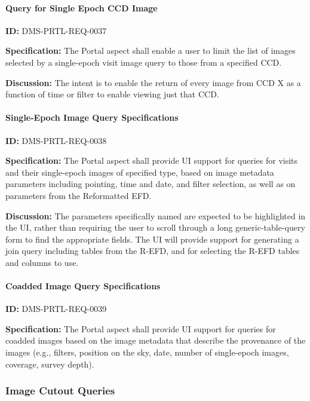 \documentclass[SE,toc]{lsstdoc}
\begin{document}
\paragraph{Query for Single Epoch CCD Image}\hfill  %

\label{DMS-PRTL-REQ-0037}
\textbf{ID:} DMS-PRTL-REQ-0037

\textbf{Specification:}
The Portal aspect shall enable a user to limit the list of images selected by a single-epoch visit image query to those from a specified CCD.

\textbf{Discussion:}
The intent is to enable the return of every image from CCD X as a function of time or filter to enable viewing just that CCD.

\paragraph{Single-Epoch Image Query Specifications}\hfill  %

\label{DMS-PRTL-REQ-0038}
\textbf{ID:} DMS-PRTL-REQ-0038

\textbf{Specification:}
The Portal aspect shall provide UI support for queries for visits and their single-epoch images of specified type, based on image metadata parameters including pointing, time and date, and filter selection, as well as on parameters from the Reformatted EFD.

\textbf{Discussion:}
The parameters specifically named are expected to be highlighted in the UI, rather than requiring the user to scroll through a long generic-table-query form to find the appropriate fields.  The UI will provide support for generating a join query including tables from the R-EFD, and for selecting the R-EFD tables and columns to use.

\paragraph{Coadded Image Query Specifications}\hfill  %

\label{DMS-PRTL-REQ-0039}
\textbf{ID:} DMS-PRTL-REQ-0039

\textbf{Specification:}
The Portal aspect shall provide UI support for queries for coadded images based on the image metadata that describe the provenance of the images (e.g., filters, position on the sky, date, number of single-epoch images, coverage, survey depth).

\subsubsection{Image Cutout Queries}
\end{document}
